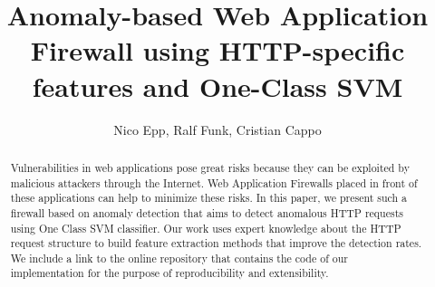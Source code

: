 \documentclass[12pt]{article}
\title{
    Anomaly-based Web Application Firewall using
    HTTP-specific features and One-Class SVM
}
\author{
    Nico Epp\inst{1},
    Ralf Funk\inst{1},
    Cristian Cappo\inst{1}
}
\begin{document}
 
    \maketitle

    \begin{abstract}
        Vulnerabilities in web applications pose great risks because they
        can be exploited by malicious attackers through the Internet.
        Web Application Firewalls placed in front of these applications
        can help to minimize these risks.
        In this paper, we present such a firewall based on anomaly detection
        that aims to detect anomalous HTTP requests using One Class SVM
        classifier.
        Our work uses expert knowledge about the HTTP request structure to
        build feature extraction methods that improve the detection rates.
        We include a link to the online repository that contains the code
        of our implementation for the purpose of reproducibility and
        extensibility.
    \end{abstract}

    

    
    
\end{document}
